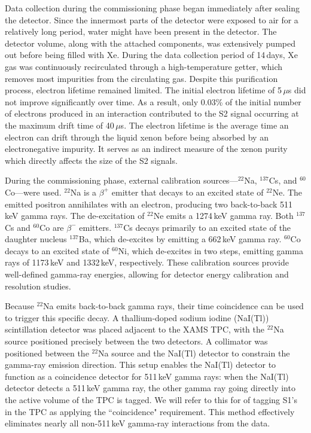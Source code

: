 Data collection during the commissioning phase began immediately after sealing the detector. Since the innermost parts of the detector were exposed to air for a relatively long period, water might have been present in the detector. The detector volume, along with the attached components, was extensively pumped out before being filled with Xe. During the data collection period of 14\,days, Xe gas was continuously recirculated through a high-temperature getter, which removes most impurities from the circulating gas. Despite this purification process, electron lifetime remained limited. The initial electron lifetime of 5\,$\mu$s did not improve significantly over time. As a result, only 0.03\% of the initial number of electrons produced in an interaction contributed to the S2 signal occurring at the maximum drift time of 40\,$\mu$s. The electron lifetime is the average time an electron can drift through the liquid xenon before being absorbed by an electronegative impurity. It serves as an indirect measure of the xenon purity which directly affects the size of the S2 signals.

During the commissioning phase, external calibration sources—$^{22}$Na, $^{137}$Cs, and $^{60}$Co—were used. $^{22}$Na is a $\beta^+$ emitter that decays to an excited state of $^{22}$Ne. The emitted positron annihilates with an electron, producing two back-to-back 511\,keV gamma rays. The de-excitation of $^{22}$Ne emits a 1274\,keV gamma ray. Both $^{137}$Cs and $^{60}$Co are $\beta^-$ emitters. $^{137}$Cs decays primarily to an excited state of the daughter nucleus $^{137}$Ba, which de-excites by emitting a 662\,keV gamma ray. $^{60}$Co decays to an excited state of $^{60}$Ni, which de-excites in two steps, emitting gamma rays of 1173\,keV and 1332\,keV, respectively. These calibration sources provide well-defined gamma-ray energies, allowing for detector energy calibration and resolution studies.

Because $^{22}$Na emits back-to-back gamma rays, their time coincidence can be used to trigger this specific decay. A thallium-doped sodium iodine (NaI(Tl)) scintillation detector was placed adjacent to the XAMS TPC, with the $^{22}$Na source positioned precisely between the two detectors. A collimator was positioned between the $^{22}$Na source and the NaI(Tl) detector to constrain the gamma-ray emission direction. This setup enables the NaI(Tl) detector to function as a coincidence detector for 511\,keV gamma rays: when the NaI(Tl) detector detects a 511\,keV gamma ray, the other gamma ray going directly into the active volume of the TPC is tagged. We will refer to this for of tagging S1's in the TPC as applying the ``coincidence" requirement. This method effectively eliminates nearly all non-511\,keV gamma-ray interactions from the data.

